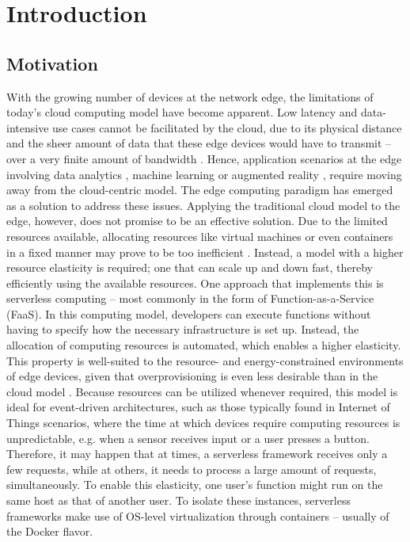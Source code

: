 \chapter{Introduction}
\label{chapter:introduction}

\section{Motivation}

With the growing number of devices at the network edge, the limitations of today's cloud computing model have become apparent. Low latency and data-intensive use cases cannot be facilitated by the cloud, due to its physical distance and the sheer amount of data that these edge devices would have to transmit -- over a very finite amount of bandwidth \cite{Aslanpour2021}.
Hence, application scenarios at the edge involving data analytics \cite{Nastic2017}, machine learning \cite{Rausch2019} or augmented reality \cite{Baresi2019}, require moving away from the cloud-centric model.
The edge computing paradigm has emerged as a solution to address these issues.
Applying the traditional cloud model to the edge, however, does not promise to be an effective solution. Due to the limited resources available, allocating resources like virtual machines or even containers in a fixed manner may prove to be too inefficient \cite{Baresi2019}.
Instead, a model with a higher resource elasticity is required; one that can scale up and down fast, thereby efficiently using the available resources.
One approach that implements this is serverless computing -- most commonly in the form of Function-as-a-Service (FaaS).
In this computing model, developers can execute functions without having to specify how the necessary infrastructure is set up. Instead, the allocation of computing resources is automated, which enables a higher elasticity. This property is well-suited to the resource- and energy-constrained environments of edge devices, given that overprovisioning is even less desirable than in the cloud model \cite{Aslanpour2021}.
Because resources can be utilized whenever required, this model is ideal for event-driven architectures, such as those typically found in Internet of Things scenarios, where the time at which devices require computing resources is unpredictable, e.g. when a sensor receives input or a user presses a button. Therefore, it may happen that at times, a serverless framework receives only a few requests, while at others, it needs to process a large amount of requests, simultaneously.
To enable this elasticity, one user's function might run on the same host as that of another user. To isolate these instances, serverless frameworks make use of OS-level virtualization through containers -- usually of the Docker flavor.
